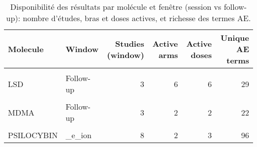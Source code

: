 \begin{table}[!h]
\centering
\caption{\label{tab:tab:outcome_by_molecule_window}Disponibilité des résultats par molécule et fenêtre (session vs follow-up): nombre d’études, bras et doses actives, et richesse des termes AE.}
\centering
\begin{tabular}[t]{llrrrr}
\toprule
Molecule & Window & Studies (window) & Active arms & Active doses & Unique AE terms\\
\midrule
\cellcolor{gray!10}{AYAHUASCA} & \cellcolor{gray!10}{\_e\_ion} & \cellcolor{gray!10}{2} & \cellcolor{gray!10}{1} & \cellcolor{gray!10}{1} & \cellcolor{gray!10}{12}\\
LSD & Follow-up & 3 & 6 & 6 & 29\\
\cellcolor{gray!10}{LSD} & \cellcolor{gray!10}{\_e\_ion} & \cellcolor{gray!10}{6} & \cellcolor{gray!10}{6} & \cellcolor{gray!10}{8} & \cellcolor{gray!10}{60}\\
MDMA & Follow-up & 3 & 2 & 2 & 22\\
\cellcolor{gray!10}{MDMA} & \cellcolor{gray!10}{\_e\_ion} & \cellcolor{gray!10}{9} & \cellcolor{gray!10}{2} & \cellcolor{gray!10}{5} & \cellcolor{gray!10}{67}\\
\addlinespace
PSILOCYBIN & \_e\_ion & 8 & 2 & 3 & 96\\
\bottomrule
\end{tabular}
\end{table}

